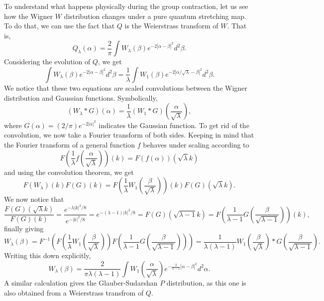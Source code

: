 \documentclass{SciPost}
\begin{document}
To understand what happens physically during the group contraction, let us see how the Wigner $W$ distribution changes under a pure quantum stretching map. To do that, we can use the fact that $Q$ is the Weierstrass transform of $W$. That is,
\begin{equation}
	Q_\lambda(\alpha)=\frac{2}{\pi}\int W_\lambda(\beta)e^{-2|\alpha-\beta|^2}d^2\beta.
\end{equation}
Considering the evolution of $Q$, we get
\begin{equation}
	\int W_\lambda(\beta)e^{-2|\alpha-\beta|^2}d^2\beta=\frac{1}{\lambda}\int W_1(\beta)e^{-2|\alpha/\sqrt{\lambda}-\beta|^2}d^2\beta.
\end{equation}
We notice that these two equations are scaled convolutions between the Wigner distribution and Gaussian functions. Symbolically,
\begin{equation}
	(W_\lambda \ast G)(\alpha)=\frac{1}{\lambda}(W_1\ast G)\left(\frac{\alpha}{\sqrt{\lambda}}\right),
\end{equation}
where $G(\alpha)=(2/\pi) e^{-2|\alpha|^2}$ indicates the Gaussian function. To get rid of the convolution, we now take a Fourier transform of both sides. Keeping in mind that the Fourier transform of a general function $f$ behaves under scaling according to
\begin{equation}
	F\left(\frac{1}{\lambda}f\left(\frac{\alpha}{\sqrt{\lambda}}\right)\right)(k)=F(f(\alpha))(\sqrt{\lambda}k)
\end{equation} and using the convolution theorem, we get
\begin{equation}
	F(W_\lambda)(k)F(G)(k)=F\left(\frac{1}{\lambda}W_1\left(\frac{\beta}{\sqrt{\lambda}}\right)\right)(k)F(G)(\sqrt{\lambda}k).  
\end{equation}
We now notice that
\begin{equation}
	\frac{F(G)(\sqrt{\lambda}k)}{F(G)(k)}=\frac{e^{-\lambda|k|^2/8}}{e^{-|k|^2/8}}=e^{-(\lambda-1)|k|^2/8}=F(G)(\sqrt{\lambda-1}k)=F\left(\frac{1}{\lambda-1}G\left(\frac{\beta}{\sqrt{\lambda-1}}\right)\right)(k),
\end{equation}
finally giving
\begin{equation}
	W_\lambda(\beta)=F^{-1}\left(F\left(\frac{1}{\lambda}W_1\left(\frac{\beta}{\sqrt{\lambda}}\right)\right)F\left(\frac{1}{\lambda-1}G\left(\frac{\beta}{\sqrt{\lambda-1}}\right)\right)\right)=\frac{1}{\lambda(\lambda-1)}W_1\left(\frac{\beta}{\sqrt{\lambda}}\right) \ast G\left(\frac{\beta}{\sqrt{\lambda-1}}\right).
	\label{Fourier}
\end{equation}
Writing this down explicitly,
\begin{equation}
	W_\lambda(\beta)=\frac{2}{\pi\lambda(\lambda-1)}\int W_1\left(\frac{\alpha}{\sqrt{\lambda}}\right)e^{-\frac{2}{\lambda-1}\left|\alpha-\beta\right|^2}d^2\alpha.
\end{equation}
A similar calculation gives the Glauber-Sudarshan $P$ distribution, as this one is also obtained from a Weierstrass transfrom of $Q$.
\end{document}
